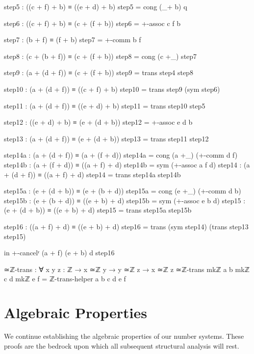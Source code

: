 \documentclass[11pt,a4paper]{book}
\begin{document}
\begin{code}
    step5 : ((c + f) + b) ≡ ((e + d) + b)
    step5 = cong (_+ b) q
    
    step6 : ((c + f) + b) ≡ (c + (f + b))
    step6 = +-assoc c f b
    
    step7 : (b + f) ≡ (f + b)
    step7 = +-comm b f
    
    step8 : (c + (b + f)) ≡ (c + (f + b))
    step8 = cong (c +_) step7
    
    step9 : (a + (d + f)) ≡ (c + (f + b))
    step9 = trans step4 step8
    
    step10 : (a + (d + f)) ≡ ((c + f) + b)
    step10 = trans step9 (sym step6)
    
    step11 : (a + (d + f)) ≡ ((e + d) + b)
    step11 = trans step10 step5
    
    step12 : ((e + d) + b) ≡ (e + (d + b))
    step12 = +-assoc e d b
    
    step13 : (a + (d + f)) ≡ (e + (d + b))
    step13 = trans step11 step12
    
\end{code}

\begin{code}
    step14a : (a + (d + f)) ≡ (a + (f + d))
    step14a = cong (a +_) (+-comm d f)
    step14b : (a + (f + d)) ≡ ((a + f) + d)
    step14b = sym (+-assoc a f d)
    step14 : (a + (d + f)) ≡ ((a + f) + d)
    step14 = trans step14a step14b
    
    step15a : (e + (d + b)) ≡ (e + (b + d))
    step15a = cong (e +_) (+-comm d b)
    step15b : (e + (b + d)) ≡ ((e + b) + d)
    step15b = sym (+-assoc e b d)
    step15 : (e + (d + b)) ≡ ((e + b) + d)
    step15 = trans step15a step15b
    
    step16 : ((a + f) + d) ≡ ((e + b) + d)
    step16 = trans (sym step14) (trans step13 step15)
    
  in +-cancelʳ (a + f) (e + b) d step16

≃ℤ-trans : ∀ {x y z : ℤ} → x ≃ℤ y → y ≃ℤ z → x ≃ℤ z
≃ℤ-trans {mkℤ a b} {mkℤ c d} {mkℤ e f} = ℤ-trans-helper a b c d e f
\end{code}

\section{Algebraic Properties}

We continue establishing the algebraic properties of our number systems. These proofs are 
the bedrock upon which all subsequent structural analysis will rest.
\end{document}
